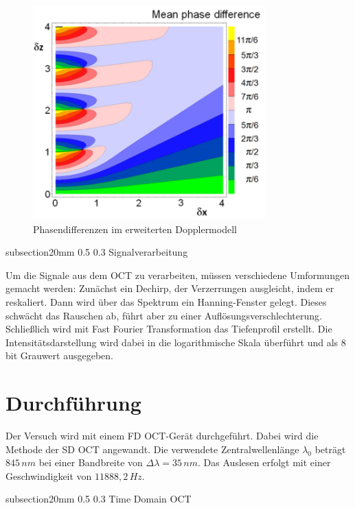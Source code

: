 \documentclass[german, %
parskip=full, %
bibliography=totoc, %
]{scrartcl}
\makeatletter
\renewcommand\subsection{\@startsection 
   {subsection}{2}{0mm}%
   {0.5\baselineskip}%
   {0.3\baselineskip}%
   {\bfseries\sffamily\large}%
   }
\makeatother
\begin{document}
\begin{figure}[ht] 
  \centering
     \includegraphics[width=0.8\textwidth]{DopplerModell}
  \caption{Phasendifferenzen im erweiterten Dopplermodell	\cite{Skript}}
  \label{fig:dopplermodell}
\end{figure}

\subsection{Signalverarbeitung}

Um die Signale aus dem OCT zu verarbeiten, müssen verschiedene Umformungen gemacht werden: Zunächst ein Dechirp, der Verzerrungen ausgleicht, indem er reskaliert. Dann wird über das Spektrum ein Hanning-Fenster gelegt. Dieses schwächt das Rauschen ab, führt aber zu einer Auflösungsverschlechterung. Schließlich wird mit Fast Fourier Transformation das Tiefenprofil erstellt. Die Intensitätsdarstellung wird dabei in die logarithmische Skala überführt und als 8\,bit Grauwert ausgegeben.

\section{Durchführung}

Der Versuch wird mit einem FD OCT-Gerät durchgeführt. Dabei wird die Methode der SD OCT angewandt. Die verwendete Zentralwellenlänge $\lambda_0$ beträgt $845\,nm$ bei einer Bandbreite von $\Delta \lambda = 35\,nm$. Das Auslesen erfolgt mit einer Geschwindigkeit von $11888,2\,Hz$.

\subsection{Time Domain OCT}
\end{document}
